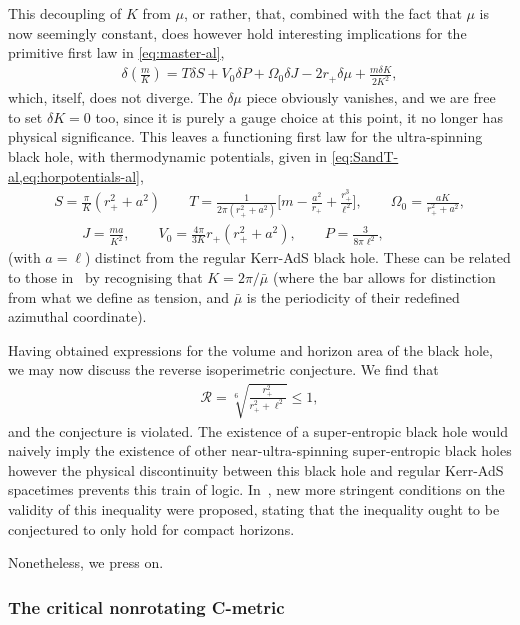 \documentclass[
twoside,
openright,
frontopenright,
]{dmathesis}
\newcommand{\nn}{\nonumber}
\begin{document}
This decoupling of $K$ from $\mu$, or rather, that, combined with the fact that
$\mu$ is now seemingly constant, does however hold interesting implications for
the primitive first law in \cref{eq:master-al},
\begin{align}\label{eq:master-al2}
\delta\left(\frac{m}{K}\right)=T\delta S +V_0\delta P + \Omega_0\delta J -
  2r_+\delta\mu + \frac{m\delta K}{2K^2},
\end{align}
which, itself, does not diverge. The $\delta \mu$ piece obviously vanishes, and
we are free to set $\delta K=0$ too, since it is purely a gauge choice at this
point, it no longer has physical significance. This leaves a functioning first
law for the ultra-spinning black hole, with thermodynamic potentials, given in
\cref{eq:SandT-al,eq:horpotentials-al},
\begin{gather}
S = \frac{\pi}{K}(r_+^2+a^2) \qquad
  T=\frac{1}{2\pi(r_{+}^{2}+a^{2})}
  \bigg[m-\frac{a^{2}}{r_{+}}+\frac{r_{+}^{3}}{\ell^{2}}\bigg],\qquad 
  \Omega_0 =  \frac{a K}{r_{+}^{2}+a^{2}}, \nn\\
  \qquad J=\frac{ma}{K^2}, \qquad V_0 =
  \frac{4\pi}{3K}r_+(r_+^2+a^2), \qquad P = \frac{3}{8\pi\ell^2}, 
\end{gather}
(with $a=\ell$) distinct from the regular Kerr-AdS black hole. These can be
related to those in~\cite{Hennigar:2014cfa,Hennigar:2015cja} by recognising that
$K=2\pi/\bar{\mu}$ (where the bar allows for distinction from what we define as
tension, and $\bar{\mu}$ is the periodicity of their redefined azimuthal
coordinate).

Having obtained expressions for the volume and horizon area of the black hole,
we may now discuss the reverse isoperimetric conjecture. We find that
\begin{align}
  \mathcal{R} =
\sqrt[6~]{\frac{r_{+}^{2}}{r_{+}^{2}+\ell^{2}}}\leqslant 1,
\end{align}
and the conjecture is violated. The existence of a super-entropic black hole
would naively imply the existence of other near-ultra-spinning super-entropic
black holes however the physical discontinuity between this black hole and
regular Kerr-AdS spacetimes prevents this train of
logic. In~\cite{Hennigar:2014cfa}, new more stringent conditions on the validity
of this inequality were proposed, stating that the inequality ought to be
conjectured to only hold for compact horizons.

Nonetheless, we press on.

\subsubsection{The critical nonrotating C-metric}
\label{sec:critnrC}
\end{document}

